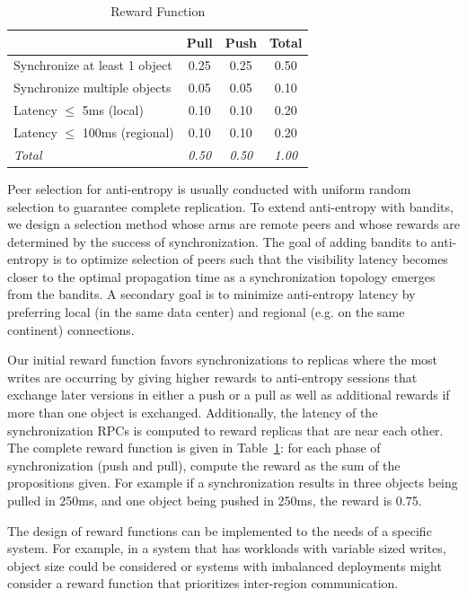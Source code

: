 \begin{table}[h]
\centering
\begin{tabular}{@{}l c c c @{}}
\toprule
& \textbf{Pull} & \textbf{Push} & \textbf{Total} \\
\midrule
Synchronize at least 1 object & 0.25 & 0.25 & 0.50 \\
Synchronize multiple objects  & 0.05 & 0.05 & 0.10 \\
Latency $\leq$ 5ms (local)        & 0.10 & 0.10 & 0.20 \\
Latency $\leq$ 100ms (regional)   & 0.10 & 0.10 & 0.20 \\
\midrule
\textit{Total} & \textit{0.50} & \textit{0.50} & \textit{1.00} \\
\bottomrule
\end{tabular}
\caption{Reward Function}
\label{tab:rewards}
\end{table}

Peer selection for anti-entropy is usually conducted with uniform random
selection to guarantee complete replication.
To extend anti-entropy with bandits, we design a selection method whose arms
are remote peers and whose rewards are determined by the success of
synchronization.
The goal of adding bandits to anti-entropy is to optimize selection of peers
such that the visibility latency becomes closer to the optimal propagation
time as a synchronization topology emerges from the bandits.
A secondary goal is to minimize anti-entropy latency by preferring local (in
the same data center) and regional (e.g. on the same continent) connections.

Our initial reward function favors synchronizations to replicas where the
most writes are occurring by giving higher rewards to anti-entropy sessions
that exchange later versions in either a push or a pull as well as additional
rewards if more than one object is exchanged.
Additionally, the latency of the synchronization RPCs is computed to reward
replicas that are near each other.
The complete reward function is given in Table~\ref{tab:rewards}: for each
phase of synchronization (push and pull), compute the reward as the sum of the
propositions given.
For example if a synchronization results in three objects being pulled in
250ms, and one object being pushed in 250ms, the reward is 0.75.

The design of reward functions can be implemented to the needs of a specific
system.
For example, in a system that has workloads with variable sized writes, object
size could be considered or systems with imbalanced deployments might
consider a reward function that prioritizes inter-region communication.


